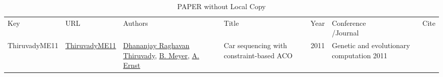{\scriptsize
\begin{longtable}{p{2cm}p{2cm}p{5cm}p{10cm}rp{3cm}l}
\rowcolor{white}\caption{PAPER without Local Copy}\\ \toprule
\rowcolor{white}Key & URL & Authors & Title & Year & \shortstack{Conference\\/Journal} & Cite\\ \midrule
\endhead
\bottomrule
\endfoot
ThiruvadyME11 & \href{}{ThiruvadyME11} & \hyperref[auth:a26]{Dhananjay Raghavan Thiruvady}, \hyperref[auth:a27]{B. Meyer}, \hyperref[auth:a28]{A. Ernst} & Car sequencing with constraint-based ACO & 2011 & Genetic and evolutionary computation 2011 & \cite{ThiruvadyME11}\\\end{longtable}
}

